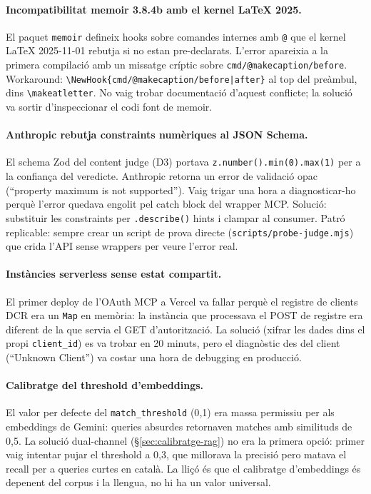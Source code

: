\paragraph{Incompatibilitat memoir 3.8.4b amb el kernel LaTeX 2025.} El paquet \texttt{memoir} defineix hooks sobre comandes internes amb \texttt{@} que el kernel LaTeX 2025-11-01 rebutja si no estan pre-declarats. L'error apareixia a la primera compilació amb un missatge críptic sobre \texttt{cmd/@makecaption/before}. Workaround: \texttt{\textbackslash NewHook\{cmd/@makecaption/before|after\}} al top del preàmbul, dins \texttt{\textbackslash makeatletter}. No vaig trobar documentació d'aquest conflicte; la solució va sortir d'inspeccionar el codi font de memoir.

\paragraph{Anthropic rebutja constraints numèriques al JSON Schema.} El schema Zod del content judge (D3) portava \texttt{z.number().min(0).max(1)} per a la confiança del veredicte. Anthropic retorna un error de validació opac (``property maximum is not supported''). Vaig trigar una hora a diagnosticar-ho perquè l'error quedava engolit pel catch block del wrapper MCP. Solució: substituir les constraints per \texttt{.describe()} hints i clampar al consumer. Patró replicable: sempre crear un script de prova directe (\texttt{scripts/probe-judge.mjs}) que crida l'API sense wrappers per veure l'error real.

\paragraph{Instàncies serverless sense estat compartit.} El primer deploy de l'OAuth MCP a Vercel va fallar perquè el registre de clients DCR era un \texttt{Map} en memòria: la instància que processava el POST de registre era diferent de la que servia el GET d'autorització. La solució (xifrar les dades dins el propi \texttt{client\_id}) es va trobar en 20 minuts, pero el diagnòstic des del client (``Unknown Client'') va costar una hora de debugging en producció.

\paragraph{Calibratge del threshold d'embeddings.} El valor per defecte del \texttt{match\_threshold} (0{,}1) era massa permissiu per als embeddings de Gemini: queries absurdes retornaven matches amb similituds de 0{,}5. La solució dual-channel (\S\ref{sec:calibratge-rag}) no era la primera opció: primer vaig intentar pujar el threshold a 0{,}3, que millorava la precisió pero matava el recall per a queries curtes en català. La lliçó és que el calibratge d'embeddings és depenent del corpus i la llengua, no hi ha un valor universal.

